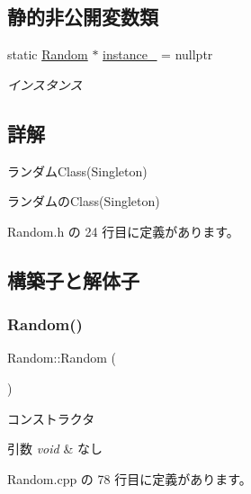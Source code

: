 \subsection*{静的非公開変数類}
\begin{DoxyCompactItemize}
\item 
static \mbox{\hyperlink{class_random}{Random}} $\ast$ \mbox{\hyperlink{class_random_a7fda13c77002515c81152b21b6d92e9e}{instance\+\_\+}} = nullptr
\begin{DoxyCompactList}\small\item\em インスタンス \end{DoxyCompactList}\end{DoxyCompactItemize}


\subsection{詳解}
ランダム\+Class(\+Singleton) 

ランダムの\+Class(\+Singleton) 

 Random.\+h の 24 行目に定義があります。



\subsection{構築子と解体子}
\mbox{\label{class_random_acb76b49c3903a3c4fb67fd216341f08d}} 
\subsubsection{\texorpdfstring{Random()}{Random()}\hspace{0.1cm}{\footnotesize\ttfamily [1/2]}}
{\footnotesize\ttfamily Random\+::\+Random (\begin{DoxyParamCaption}{ }\end{DoxyParamCaption})\hspace{0.3cm}{\ttfamily [private]}}



コンストラクタ 


\begin{DoxyParams}{引数}
{\em void} & なし \\
\hline
\end{DoxyParams}


 Random.\+cpp の 78 行目に定義があります。

\mbox{\label{class_random_a6ae0395173fd90135e5f4fc643532f1f}} 
